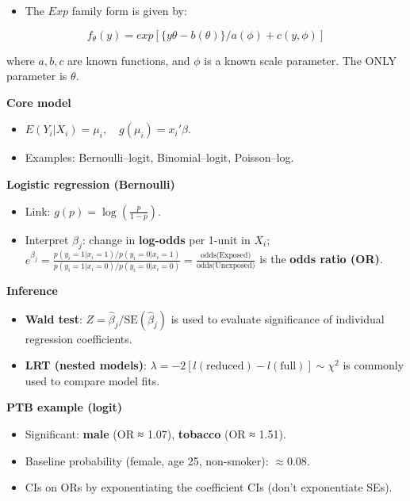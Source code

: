 \documentclass[
  letterpaper,
  DIV=11,
  numbers=noendperiod]{scrreprt}
\providecommand{\tightlist}{%
  \setlength{\itemsep}{0pt}\setlength{\parskip}{0pt}}\usepackage{longtable,booktabs,array}
\begin{document}
\begin{itemize}
\tightlist
\item
  The \(Exp\) family form is given by:
\end{itemize}

\[
f_{\theta} (y) = exp[\{y\theta - b(\theta)\} / a(\phi) + c(y, \phi )]
\]

where \(a, b, c\) are known functions, and \(\phi\) is a known scale
parameter. The ONLY parameter is \(\theta\).

\textbf{Core model}

\begin{itemize}
\tightlist
\item
  \(E(Y_i|X_i)=\mu_i,\quad g(\mu_i)=x_i'\beta\).
\item
  Examples: Bernoulli--logit, Binomial--logit, Poisson--log.
\end{itemize}

\textbf{Logistic regression (Bernoulli)}

\begin{itemize}
\tightlist
\item
  Link: \(g(p)=\log\!\left(\frac{p}{1-p}\right)\).
\item
  Interpret \(\beta_j\): change in \textbf{log-odds} per 1-unit in
  \(X_i\);
  \(e^{\beta_j} = \frac{p(y_i=1|x_i=1)/p(y_i=0|x_i=1)}{p(y_i=1|x_i=0)/p(y_i=0|x_i=0)} = \frac{\text{odds(Exposed)}}{\text{odds(Unexposed)}}\)
  is the \textbf{odds ratio (OR)}.
\end{itemize}

\textbf{Inference}

\begin{itemize}
\tightlist
\item
  \textbf{Wald test}: \(Z=\hat\beta_j/\text{SE}(\hat\beta_j)\) is used
  to evaluate significance of individual regression coefficients.
\item
  \textbf{LRT (nested models)}:
  \(\lambda=-2[l(\text{reduced})-l(\text{full})]\sim\chi^2\) is commonly
  used to compare model fits.
\end{itemize}

\textbf{PTB example (logit)}

\begin{itemize}
\tightlist
\item
  Significant: \textbf{male} (OR ≈ 1.07), \textbf{tobacco} (OR ≈ 1.51).
\item
  Baseline probability (female, age 25, non-smoker): \(\approx 0.08\).
\item
  CIs on ORs by exponentiating the coefficient CIs (don't exponentiate
  SEs).
\end{itemize}
\end{document}
